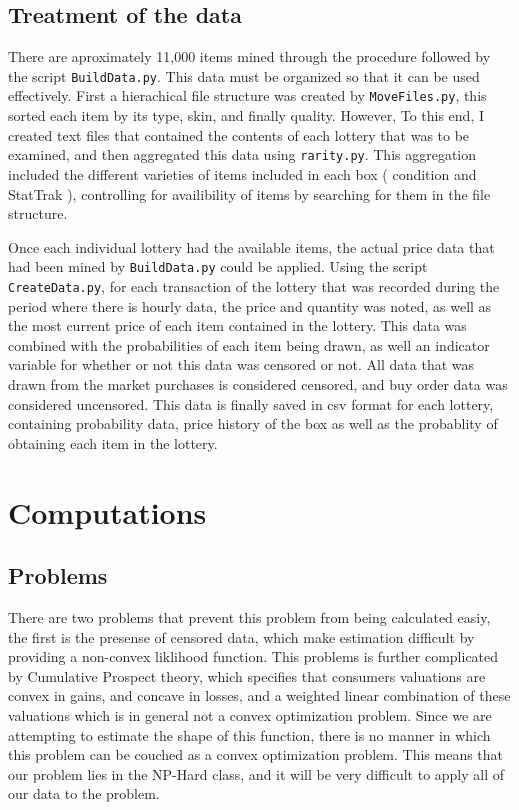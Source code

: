 \documentclass[11pt]{article}
\begin{document}
\subsection{Treatment of the data}
\label{sec-3-3}
There are aproximately 11,000 items mined through the procedure
followed by the script \texttt{BuildData.py}. This data must be organized so
that it can be used effectively. First a hierachical file structure
was created by \texttt{MoveFiles.py}, this sorted each item by its type,
skin, and finally quality. However, To this end, I created text files
that contained the contents of each lottery that was to be examined,
and then aggregated this data using \texttt{rarity.py}. This aggregation
included the different varieties of items included in each box (
condition and StatTrak ), controlling for availibility of items by
searching for them in the file structure. 

Once each individual lottery had the available items, the actual price
data that had been mined by \texttt{BuildData.py} could be applied. Using the
script \texttt{CreateData.py}, for each transaction of the lottery that was
recorded during the period where there is hourly data, the price and
quantity was noted, as well as the most current price of each item
contained in the lottery. This data was combined with the
probabilities of each item being drawn, as well an indicator variable
for whether or not this data was censored or not. All data that was
drawn from the market purchases is considered censored, and buy order
data was considered uncensored. This data is finally saved in csv
format for each lottery, containing probability data, price history of
the box as well as the probablity of obtaining each item in the lottery.

\section{Computations}
\label{sec-4}
\subsection{Problems}
\label{sec-4-1}
There are two problems that prevent this problem from being calculated
easiy, the first is the presense of censored data, which make
estimation difficult by providing a non-convex liklihood
function. This problems is further complicated by Cumulative Prospect
theory, which specifies that consumers valuations are convex in gains,
and concave in losses, and a weighted linear combination of these
valuations which is in general not a convex optimization
problem. Since we are attempting to estimate the shape of this
function, there is no manner in which this problem can be couched as a
convex optimization problem. This means that our problem lies in the
NP-Hard class, and it will be very difficult to apply all of our data
to the problem.
\end{document}
